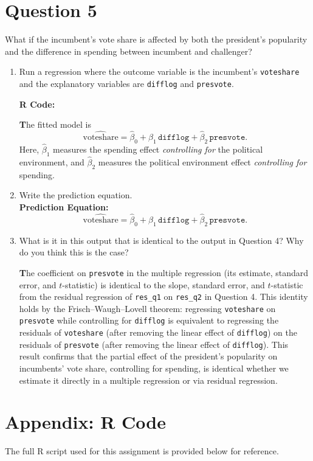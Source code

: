 \documentclass[12pt,letterpaper]{article}
\begin{document}
	\newpage	

\section*{Question 5}
\noindent What if the incumbent's vote share is affected by both the president's popularity and the difference in spending between incumbent and challenger? 
	\begin{enumerate}
		\item Run a regression where the outcome variable is the incumbent's \texttt{voteshare} and the explanatory variables are \texttt{difflog} and \texttt{presvote}.
		
		\vspace{0.3cm}
		\noindent\textbf{R Code:}
		
		\vspace{0.3cm}
		\noindent\textbf
		The fitted model is
		\[
		\widehat{\text{voteshare}} = \hat{\beta}_0 + \hat{\beta}_1\,\texttt{difflog} + \hat{\beta}_2\,\texttt{presvote}.
		\]
		Here, $\hat{\beta}_1$ measures the spending effect \emph{controlling for} the political environment, and $\hat{\beta}_2$ measures the political environment effect \emph{controlling for} spending.
		
		\vspace{0.3cm}
		
		\item Write the prediction equation. \\[0.2cm]
		
		\noindent\textbf{Prediction Equation:}
		\[
		\widehat{\text{voteshare}} = \hat{\beta}_0 + \hat{\beta}_1\,\texttt{difflog} + \hat{\beta}_2\,\texttt{presvote}.
		\]
		
		\vspace{0.3cm}
		\newpage
		\item What is it in this output that is identical to the output in Question 4? Why do you think this is the case?
		
		\noindent\textbf The coefficient on \texttt{presvote} in the multiple regression (its estimate, standard error, and $t$-statistic) is identical to the slope, standard error, and $t$-statistic from the residual regression of \texttt{res\_q1} on \texttt{res\_q2} in Question 4. This identity holds by the Frisch–Waugh–Lovell theorem: regressing \texttt{voteshare} on \texttt{presvote} while controlling for \texttt{difflog} is equivalent to regressing the residuals of \texttt{voteshare} (after removing the linear effect of \texttt{difflog}) on the residuals of \texttt{presvote} (after removing the linear effect of \texttt{difflog}). This result confirms that the partial effect of the president’s popularity on incumbents’ vote share, controlling for spending, is identical whether we estimate it directly in a multiple regression or via residual regression.
		
	\end{enumerate}

\newpage
\appendix
\section*{Appendix: R Code}

\noindent The full R script used for this assignment is provided below for reference.


\end{document}
